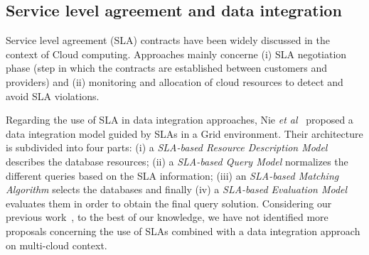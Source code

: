 \subsection{Service level agreement and data integration}
Service level agreement (SLA) contracts have been widely discussed in the context of Cloud computing.
Approaches mainly concerne (i) SLA negotiation phase (step in which the
contracts are established between customers and providers) and (ii)
monitoring and allocation of cloud resources to detect and avoid SLA
violations.

Regarding the use of SLA in data integration approaches, Nie \textit{et
al}~\cite{Nie07} proposed a data integration model guided by SLAs in a Grid environment.
Their architecture is subdivided into four parts: (i) a \textit{SLA-based
Resource Description Model} describes the database resources; (ii)
a \textit{SLA-based Query Model} normalizes the different queries based on the
SLA information; (iii) an \textit{SLA-based Matching Algorithm}  
selects the databases and finally (iv) a \textit{SLA-based Evaluation Model}
evaluates them in order to obtain the final query solution.
Considering our previous work~\cite{012}, to the best of our knowledge, we have
not identified more proposals concerning the use of SLAs combined with a data
integration approach on multi-cloud context.
